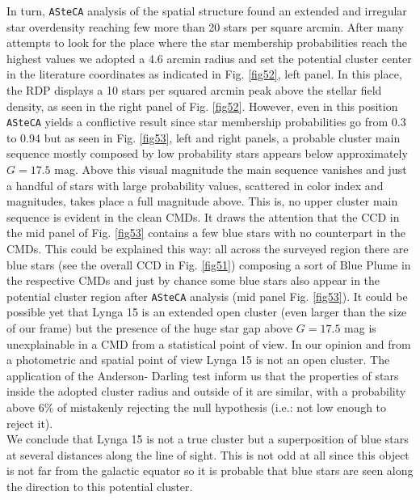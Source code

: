 \documentclass[draft]{aa}
\begin{document}
In turn, \texttt{ASteCA} analysis of the spatial structure found an extended and
irregular star overdensity reaching few more than 20 stars per square arcmin.
After many attempts to look for the place where the star membership
probabilities reach the highest values we adopted a 4.6 arcmin radius and set
the potential cluster center in the literature coordinates as indicated in Fig.
\ref{fig52}, left panel. In this place, the RDP displays a 10 stars per squared
arcmin peak above the stellar field density, as seen in the right panel of Fig. 
\ref{fig52}.
However, even in this position \texttt{ASteCA} yields a conflictive result
since star membership probabilities go from 0.3 to 0.94 but as seen in Fig. 
\ref{fig53}, left and right panels, a probable cluster main sequence mostly
composed by low probability stars appears below approximately $G=17.5$ mag.
Above this visual magnitude the main sequence vanishes and just a handful of
stars with large probability values, scattered in color index and magnitudes,
takes place a full magnitude above. This is, no upper cluster main sequence is
evident in the clean CMDs. It draws the attention that the CCD in the mid panel
of Fig. \ref{fig53} contains a few blue stars with no counterpart in the CMDs.
This could be explained this way: all across the surveyed region there are blue
stars (see the overall CCD in Fig. \ref{fig51}) composing a sort of Blue Plume
in the respective CMDs and just by chance some blue stars also appear in the
potential cluster region after \texttt{ASteCA} analysis (mid panel Fig. 
\ref{fig53}). It could be possible yet that Lynga 15 is an
extended open cluster (even larger than the size of our frame) but the presence
of the huge star gap above $G=17.5$ mag is unexplainable in a CMD from a
statistical point of view. In our opinion and from a photometric and spatial
point of view Lynga 15 is not an open cluster. The application of the Anderson-
Darling test inform us that the properties of stars inside the adopted cluster
radius and outside of it are similar, with a probability above 6\% of
mistakenly rejecting the null hypothesis (i.e.: not low enough to reject it).\\

We conclude that Lynga 15 is not a true cluster but a superposition of blue
stars at several distances along the line of sight.
This is not odd at all since this object is not far from the galactic equator
so it is probable that blue stars are seen along the direction to this
potential cluster.
\end{document}
